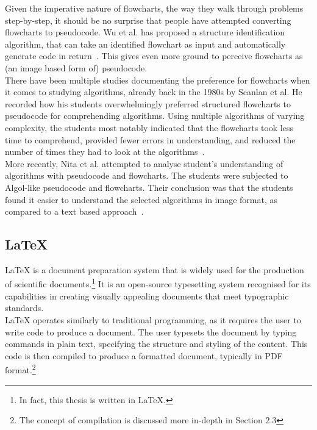 Given the imperative nature of flowcharts, the way they walk through problems step-by-step, it should be no surprise that people have attempted converting flowcharts to pseudocode. Wu et al. has proposed a structure identification algorithm, that can take an identified flowchart as input and automatically generate code in return~\cite{codeFromFlowcharts}. This gives even more ground to perceive flowcharts as (an image based form of) pseudocode. \\

There have been multiple studies documenting the preference for flowcharts when it comes to studying algorithms, already back in the 1980s by Scanlan et al. He recorded how his students overwhelmingly preferred structured flowcharts to pseudocode for comprehending algorithms. Using multiple algorithms of varying complexity, the students most notably indicated that the flowcharts took less time to comprehend, provided fewer errors in understanding, and reduced the number of times they had to look at the algorithms~\cite{flowchartsAreGood1}. \\

More recently, Nita et al. attempted to analyse student's understanding of algorithms with pseudocode and flowcharts. The students were subjected to Algol-like pseudocode and flowcharts. Their conclusion was that the students found it easier to understand the selected algorithms in image format, as compared to a text based approach~\cite{flowchartsAreGood4}.

\subsection{LaTeX}

LaTeX is a document preparation system that is widely used for the production of scientific documents.\footnote{In fact, this thesis is written in LaTeX.} It is an open-source typesetting system recognised for its capabilities in creating visually appealing documents that meet typographic standards. \\

LaTeX operates similarly to traditional programming, as it requires the user to write code to produce a document. The user typesets the document by typing commands in plain text, specifying the structure and styling of the content. This code is then compiled to produce a formatted document, typically in PDF format.\footnote{The concept of compilation is discussed more in-depth in Section 2.3} \\

